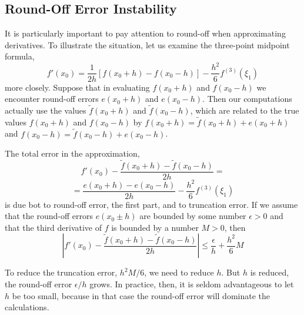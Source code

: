 \subsection{Round-Off Error Instability}
It is particularly important to pay attention to round-off when approximating derivatives. To illustrate the situation, let us examine the three-point midpoint formula,
\[ f'(x_0) = \frac{1}{2h} [f(x_0 + h) - f(x_0 -h)] - \frac{h^2}{6} f^{(3)}(\xi_1) \]
more closely. Suppose that in evaluating $f(x_0 + h)$ and $f(x_0 - h)$ we encounter round-off errors $e(x_0 + h)$ and $e(x_0 - h)$. Then our computations actually use the values $\tilde{f}(x_0 + h)$ and $\tilde{f}(x_0 - h)$, which are related to the true values $f(x_0 + h)$ and $f(x_0 - h)$ by $ f(x_0 + h) = \tilde{f}(x_0 + h) + e(x_0 + h) $ and $ f(x_0 - h) = \tilde{f}(x_0 - h) + e(x_0 - h) $.

The total error in the approximation,
\[ f'(x_0) - \frac{\tilde{f}(x_0 + h) - \tilde{f}(x_0 - h)}{2h} = \]
\[ = \frac{e(x_0 + h) - e (x_0 - h)}{2h} - \frac{h^2}{6} f^{(3)}(\xi_1)\]
is due bot to round-off error, the first part, and to truncation error. If we assume that the round-off errors $e(x_0 \pm h)$ are bounded by some number $\epsilon > 0$ and that the third derivative of $f$ is bounded by a number $M > 0$, then 
\[ \left| f'(x_0) - \frac{\tilde{f}(x_0 + h) - \tilde{f}(x_0 - h)}{2h} \right| \leq \frac{\epsilon}{h} + \frac{h^2}{6}M\]

To reduce the truncation error, $h^2 M/6$, we need to reduce $h$. But $h$ is reduced, the round-off error $\epsilon/h$ grows. In practice, then, it is seldom advantageous to let $h$ be too small, because in that case the round-off error will dominate the calculations.
